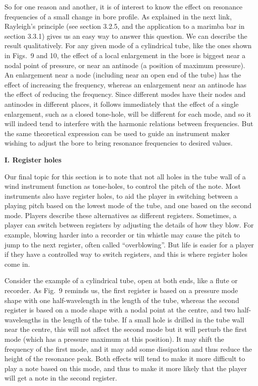   So for one reason and another, it is of interest to know the effect on 
  resonance frequencies of a small change in bore profile. As explained in the 
  next link, Rayleigh’s principle (see section 3.2.5, and the application to a 
  marimba bar in section 3.3.1) gives us an easy way to answer this question. 
  We can describe the result qualitatively. For any given mode of a cylindrical 
  tube, like the ones shown in Figs.\ 9 and 10, the effect of a local 
  enlargement in the bore is biggest near a nodal point of pressure, or near an 
  antinode (a position of maximum pressure). An enlargement near a node 
  (including near an open end of the tube) has the effect of increasing the 
  frequency, whereas an enlargement near an antinode has the effect of reducing 
  the frequency. Since different modes have their nodes and antinodes in 
  different places, it follows immediately that the effect of a single 
  enlargement, such as a closed tone-hole, will be different for each mode, and 
  so it will indeed tend to interfere with the harmonic relations between 
  frequencies. But the same theoretical expression can be used to guide an 
  instrument maker wishing to adjust the bore to bring resonance frequencies to 
  desired values. 

  \textbf{I. Register holes} 

  Our final topic for this section is to note that not all holes in the tube 
  wall of a wind instrument function as tone-holes, to control the pitch of the 
  note. Most instruments also have register holes, to aid the player in 
  switching between a playing pitch based on the lowest mode of the tube, and 
  one based on the second mode. Players describe these alternatives as 
  different registers. Sometimes, a player can switch between registers by 
  adjusting the details of how they blow. For example, blowing harder into a 
  recorder or tin whistle may cause the pitch to jump to the next register, 
  often called “overblowing”. But life is easier for a player if they have a 
  controlled way to switch registers, and this is where register holes come in. 

  Consider the example of a cylindrical tube, open at both ends, like a flute 
  or recorder. As Fig.\ 9 reminds us, the first register is based on a pressure 
  mode shape with one half-wavelength in the length of the tube, whereas the 
  second register is based on a mode shape with a nodal point at the centre, 
  and two half-wavelengths in the length of the tube. If a small hole is 
  drilled in the tube wall near the centre, this will not affect the second 
  mode but it will perturb the first mode (which has a pressure maximum at this 
  position). It may shift the frequency of the first mode, and it may add some 
  dissipation and thus reduce the height of the resonance peak. Both effects 
  will tend to make it more difficult to play a note based on this mode, and 
  thus to make it more likely that the player will get a note in the second 
  register. 

